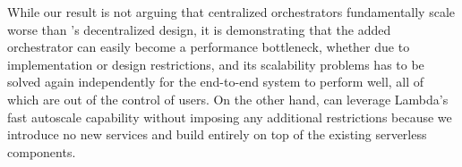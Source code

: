 While our result is not arguing that centralized orchestrators fundamentally
scale worse than \name{}'s decentralized design, it is demonstrating that the
added orchestrator can easily become a performance bottleneck, whether due to
implementation or design restrictions, and its scalability problems has to be
solved again independently for the end-to-end system to perform well, all of which are out of the control of users. On the
other hand, \name{} can leverage Lambda's fast autoscale capability without
imposing any additional restrictions because we introduce no new services and
build entirely on top of the existing serverless components.








